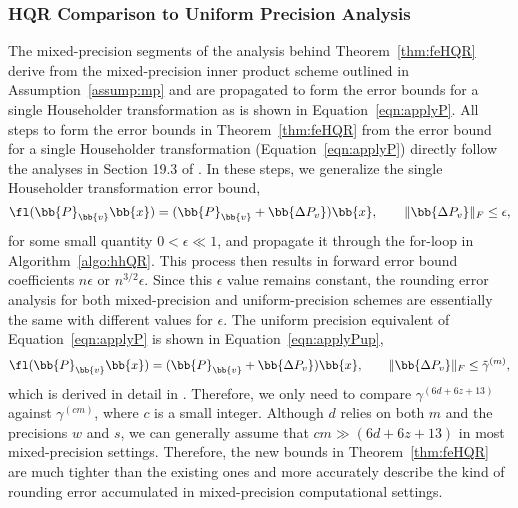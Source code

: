 \subsubsection{HQR Comparison to Uniform Precision Analysis}
\label{sec:mpupHQRcomparison}
The mixed-precision segments of the analysis behind Theorem~\ref{thm:feHQR} derive from the mixed-precision inner product scheme outlined in Assumption~\ref{assump:mp} and are propagated to form the error bounds for a single Householder transformation as is shown in Equation~\ref{eqn:applyP}.
All steps to form the error bounds in Theorem~\ref{thm:feHQR} from the error bound for a single Householder transformation (Equation~\ref{eqn:applyP}) directly follow the analyses in Section 19.3 of \cite{Higham2002}.
In these steps, we generalize the single Householder transformation error bound, 
\begin{equation}
\fl(\bb{P}_{\bb{v}}\bb{x})= (\bb{P}_{\bb{v}} + \bb{\Delta P_{v}})\bb{x},\qquad \|\bb{\Delta P_v}\|_F \leq \epsilon,\label{eqn:applyPgen}
\end{equation}
for some small quantity $0<\epsilon\ll 1$, and propagate it through the for-loop in Algorithm~\ref{algo:hhQR}. 
This process then results in forward error bound coefficients $n\epsilon$ or $n^{3/2}\epsilon$.
Since this $\epsilon$ value remains constant, the rounding error analysis for both mixed-precision and uniform-precision schemes are essentially the same with different values for $\epsilon$.
The uniform precision equivalent of Equation~\ref{eqn:applyP} is shown in Equation~\ref{eqn:applyPup},
\begin{equation}
\fl(\bb{P}_{\bb{v}}\bb{x})= (\bb{P}_{\bb{v}} + \bb{\Delta P_{v}})\bb{x},\qquad \|\bb{\Delta P_v}\|_F \leq \tilde{\gamma}^{(m)},
\label{eqn:applyPup}
\end{equation}
which is derived in detail in \cite{Higham2002}.
Therefore, we only need to compare $\gamma^{(6d+6z+13)}$ against $\gamma^{(cm)}$, where $c$ is a small integer. 
Although $d$ relies on both $m$ and the precisions $w$ and $s$, we can generally assume that $cm\gg (6d+6z+13)$ in most mixed-precision settings.
Therefore, the new bounds in Theorem~\ref{thm:feHQR} are much tighter than the existing ones and more accurately describe the kind of rounding error accumulated in mixed-precision computational settings.
